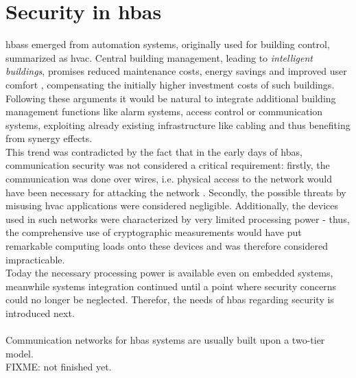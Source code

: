 \section{Security in \gls{hbas}}\label{hbaSec}
\glspl{hbas} emerged from automation systems, originally used for building control, summarized as \gls{hvac}.
Central building management, leading to \textit{intelligent buildings}, promises
reduced maintenance costs, energy savings and improved user comfort \cite{1435745}, compensating the initially higher investment costs of such buildings.
Following these arguments it would be natural to integrate additional building management functions like alarm systems, access control or communication systems,
exploiting already existing infrastructure like cabling and thus benefiting from synergy effects.
\\
This trend was contradicted by the fact that in the early days of \gls{hbas}, communication security was not considered a critical requirement:
firstly, the communication was done over wires,
i.e. physical access to the network would have been necessary for attacking the network \cite{knxSpec}. Secondly, the possible threats by misusing \gls{hvac} applications
were considered negligible. Additionally, the devices used in such networks were characterized by very limited processing power - thus, the comprehensive
use of cryptographic measurements would have put remarkable computing loads onto these devices and was therefore considered impracticable.
\\
Today the necessary processing power is available even on embedded systems, meanwhile systems integration continued until a point where security concerns could
no longer be neglected. Therefor, the needs of \gls{hbas} regarding security is introduced next.
\\
\\
Communication networks for \gls{hbas} systems are usually built upon a two-tier model.
\\
FIXME: not finished yet.
